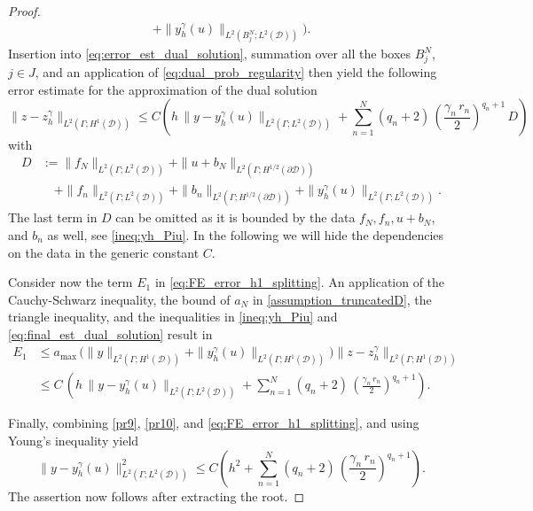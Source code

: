 \documentclass[a4paper,10pt]{article}
\newcommand{\cD}{{\mathcal{D}}}
\newcommand{\yH}{{L^2(\Gamma;H^1(\cD))}}
\numberwithin{theorem}{section}
\begin{document}
\begin{proof}
\begin{align*}
    + \|y_h^\gamma(u)\|_{L^2(B_j^N; L^2(\cD))}\Big).
  \end{align*}
  Insertion into \eqref{eq:error_est_dual_solution}, summation over all the boxes $B_j^N$, $j\in J$, and an application of \eqref{eq:dual_prob_regularity} then yield the following error estimate for the approximation of the dual solution
  \begin{equation}\label{eq:final_est_dual_solution}
    \|z-z_h^\gamma\|_{L^2(\Gamma; H^1(\cD))}
    \le C\left(h\,\|y-y_h^\gamma(u)\|_{L^2(\Gamma; L^2(\cD))}
    + \sum_{n=1}^N (q_n+2)\,\left(\frac{\gamma_n\,r_n}{2}\right)^{q_n+1}\,D\right)
  \end{equation}
  with
  \begin{align*}
    D&:= \|f_N\|_{L^2(\Gamma; L^2(\cD))} + \|u + b_N\|_{L^2(\Gamma;H^{1/2}(\partial\cD))} \\
    &\quad+ \|f_n\|_{L^2(\Gamma; L^2(\cD))} + \|b_n\|_{L^2(\Gamma; H^{1/2}(\partial\cD))}
    + \|y_h^\gamma(u)\|_{L^2(\Gamma; L^2(\cD))}.
  \end{align*}
  The last term in $D$ can be omitted as it is bounded by the data $f_N, f_n, u+b_N$, and $b_n$ as well, see \eqref{ineq:yh_Piu}. In the following we will hide the dependencies on the data in the generic constant $C$.

  Consider now the term $E_1$ in \eqref{eq:FE_error_h1_splitting}.
  An application of  the Cauchy-Schwarz inequality, the bound of $a_N$ in \eqref{assumption_truncatedD},  the triangle inequality, and the inequalities in \eqref{ineq:yh_Piu} and \eqref{eq:final_est_dual_solution} result in 
\begin{align}
\label{pr10}
  E_1
  & \leq  a_{\max} \, \big( \|y\|_{\yH} + \|y_h^{\gamma}(u)\|_{\yH} \big)   \|z - z_h^\gamma\|_{L^2(\Gamma; H^1(\cD))}  \nonumber \\ 
  & \leq   C\,\left(h\,\|y-y_h^\gamma(u)\|_{L^2(\Gamma; L^2(\cD))}
    + \sum_{n=1}^N (q_n+2)\,\left(\frac{\gamma_n\,r_n}{2}\right)^{q_n+1}\right).
\end{align}

Finally, combining \eqref{pr9}, \eqref{pr10}, and \eqref{eq:FE_error_h1_splitting}, and using Young's inequality yield
\begin{equation*}
  \|y-y_h^\gamma(u)\|_{L^2(\Gamma; L^2(\cD))}^2 \le C\left(h^2 
  + \sum_{n=1}^N(q_n+2)\,\left(\frac{\gamma_n\,r_n}{2}\right)^{q_n+1}\right).
\end{equation*}
The assertion now follows after extracting the root.
\end{proof}
\end{document}

